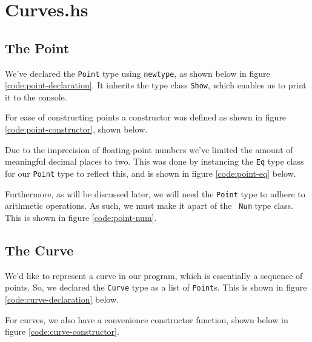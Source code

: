 \section{Curves.hs}

\subsection{The Point}
We've declared the {\tt Point} type using {\tt newtype}, as shown below in
figure \ref{code:point-declaration}. It inherits the type class {\tt Show},
which enables us to print it to the console.


For ease of constructing points a constructor was defined as shown in figure
\ref{code:point-constructor}, shown below.


Due to the imprecision of floating-point numbers we've limited the amount of
meaningful decimal places to two. This was done by instancing the {\tt Eq}
type class for our {\tt Point} type to reflect this, and is shown in figure
\ref{code:point-eq} below.


Furthermore, as will be discussed later, we will need the {\tt Point} type to
adhere to arithmetic operations. As such, we must make it apart of the {\tt
Num} type class. This is shown in figure \ref{code:point-num}.




\subsection{The Curve}
We'd like to represent a curve in our program, which is essentially a sequence
of points. So, we declared the {\tt Curve} type as a list of {\tt Point}s.
This is shown in figure \ref{code:curve-declaration} below.


For curves, we also have a convenience constructor function, shown below in
figure \ref{code:curve-constructor}.

